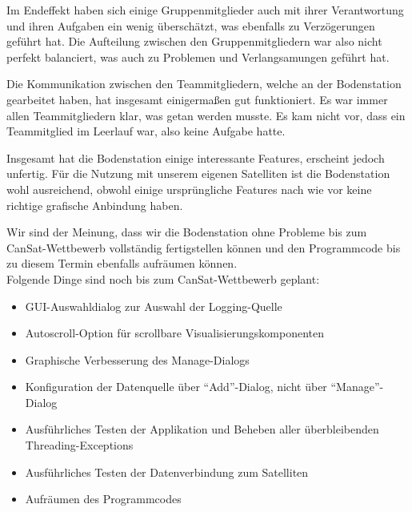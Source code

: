 Im Endeffekt haben sich einige Gruppenmitglieder auch mit ihrer Verantwortung und ihren Aufgaben ein wenig überschätzt, was ebenfalls zu Verzögerungen geführt hat. Die Aufteilung zwischen den Gruppenmitgliedern war also nicht perfekt balanciert, was auch zu Problemen und Verlangsamungen geführt hat.

Die Kommunikation zwischen den Teammitgliedern, welche an der Bodenstation gearbeitet haben, hat insgesamt einigermaßen gut funktioniert. Es war immer allen Teammitgliedern klar, was getan werden musste. Es kam nicht vor, dass ein Teammitglied im Leerlauf war, also keine Aufgabe hatte.

Insgesamt hat die Bodenstation einige interessante Features, erscheint jedoch unfertig. Für die Nutzung mit unserem eigenen Satelliten ist die Bodenstation wohl ausreichend, obwohl einige ursprüngliche Features nach wie vor keine richtige grafische Anbindung haben.

Wir sind der Meinung, dass wir die Bodenstation ohne Probleme bis zum CanSat-Wettbewerb vollständig fertigstellen können und den Programmcode bis zu diesem Termin ebenfalls aufräumen können. \\
Folgende Dinge sind noch bis zum CanSat-Wettbewerb geplant:
\begin{itemize}
	\item GUI-Auswahldialog zur Auswahl der Logging-Quelle
	\item Autoscroll-Option für scrollbare Visualisierungskomponenten
	\item Graphische Verbesserung des Manage-Dialogs
	\item Konfiguration der Datenquelle über ``Add''-Dialog, nicht über ``Manage''-Dialog
	\item Ausführliches Testen der Applikation und Beheben aller überbleibenden Threading-Exceptions
	\item Ausführliches Testen der Datenverbindung zum Satelliten
	\item Aufräumen des Programmcodes
\end{itemize}

